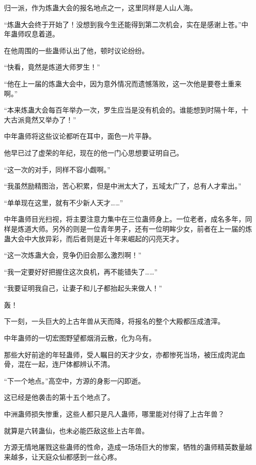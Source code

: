 
\begin{this_body}

归一派，作为炼蛊大会的报名地点之一，这里同样是人山人海。

“炼蛊大会终于开始了！没想到我今生还能得到第二次机会，实在是感谢上苍。”中年蛊师叹息着道。

在他周围的一些蛊师认出了他，顿时议论纷纷。

“快看，竟然是炼道大师罗生！”

“他在上一届的炼蛊大会中，因为意外情况而遗憾落败，这一次他是要卷土重来啊。”

“本来炼蛊大会每百年举办一次，罗生应当是没有机会的。谁能想到时隔十年，十大古派竟然又举办了！”

中年蛊师将这些议论都听在耳中，面色一片平静。

他早已过了虚荣的年纪，现在的他一门心思想要证明自己。

“这一次的对手，同样不容小觑啊。”

“我虽然励精图治，苦心积累，但是中洲太大了，五域太广了，总有人才辈出。”

“单单现在这里，就有不少新人天才……”

中年蛊师目光扫视，将主要注意力集中在三位蛊师身上。一位老者，成名多年，同样是炼道大师。另外的则是一位青年男子，还有一位明眸少女，前者在上一届的炼蛊大会中大放异彩，而后者则是近十年来崛起的闪亮天才。

“这一次炼蛊大会，竞争仍旧会那么激烈啊！”

“我一定要好好把握住这次良机，再不能错失了……”

“我要证明我自己，让妻子和儿子都抬起头来做人！”

轰！

下一刻，一头巨大的上古年兽从天而降，将报名的整个大殿都压成渣滓。

中年蛊师的一切宏图野望都烟消云散，化为乌有。

那些大好前途的年轻蛊师，受人瞩目的天才少女，亦都惨死当场，被压成肉泥血骨，混在一起，连尸体都辨认不清。

“下一个地点。”高空中，方源的身影一闪即逝。

这已经是他袭击的第十五个地点了。

中洲蛊师损失惨重，这些人都只是凡人蛊师，哪里能对付得了上古年兽？

就算是六转蛊仙，也未必能匹敌这些上古年兽。

方源无情地屠戮这些蛊师的性命，造成一场场巨大的惨案，牺牲的蛊师精英数量越来越多，让天庭众仙都感到一丝心疼。


\end{this_body}
